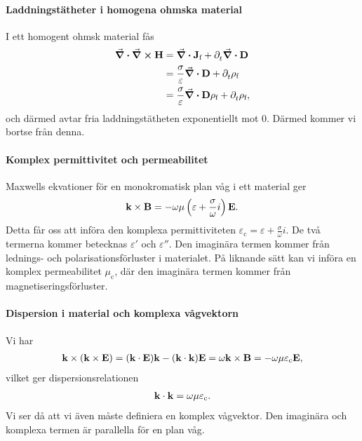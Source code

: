 \paragraph{Laddningstätheter i homogena ohmska material}
I ett homogent ohmsk material fås
\begin{align*}
	\div{\curl{\vb{H}}} &= \div{\vb{J}_{\text{f}}} + \partial_{t}^{}\div{\vb{D}} \\
	                    &= \frac{\sigma}{\varepsilon}\div{\vb{D}} + \partial_{t}^{}\rho_{\text{f}} \\
	                    &= \frac{\sigma}{\varepsilon}\div{\vb{D}}\rho_{\text{f}} + \partial_{t}^{}\rho_{\text{f}},
\end{align*}
och därmed avtar fria laddningstätheten exponentiellt mot $0$. Därmed kommer vi bortse från denna.

\paragraph{Komplex permittivitet och permeabilitet}
Maxwells ekvationer för en monokromatisk plan våg i ett material ger
\begin{align*}
	\vb{k}\times\vb{B} = -\omega\mu\left(\varepsilon + \frac{\sigma}{\omega}i\right)\vb{E}.
\end{align*}
Detta får oss att införa den komplexa permittiviteten $\varepsilon_{\text{c}} = \varepsilon + \frac{\sigma}{\omega}i$. De två termerna kommer betecknas $\varepsilon'$ och $\varepsilon''$. Den imaginära termen kommer från lednings- och polarisationsförluster i materialet. På liknande sätt kan vi införa en komplex permeabilitet $\mu_{\text{c}}$, där den imaginära termen kommer från magnetiseringsförluster.

\paragraph{Dispersion i material och komplexa vågvektorn}
Vi har
\begin{align*}
	\vb{k}\times(\vb{k}\times\vb{E}) = (\vb{k}\cdot\vb{E})\vb{k} - (\vb{k}\cdot\vb{k})\vb{E} = \omega\vb{k}\times\vb{B} = -\omega\mu\varepsilon_{\text{c}}\vb{E},
\end{align*}
vilket ger dispersionsrelationen
\begin{align*}
	\vb{k}\cdot\vb{k} = \omega\mu\varepsilon_{\text{c}}.
\end{align*}
Vi ser då att vi även måste definiera en komplex vågvektor. Den imaginära och komplexa termen är parallella för en plan våg.

